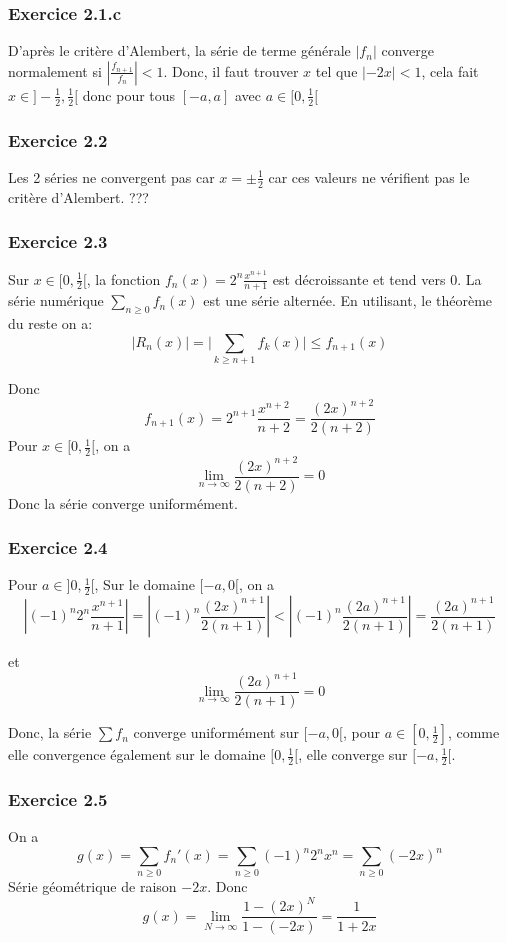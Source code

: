 \documentclass[]{book}
\theoremstyle{definition}
\begin{document}
\subsubsection*{Exercice 2.1.c}
D'apr\`es le crit\`ere d'Alembert, la s\'erie de terme g\'en\'erale $\lvert f_n \rvert$ converge normalement si $\left\lvert \frac{f_{n+1}}{f_n} \right\rvert < 1$. Donc, il faut trouver $x$ tel que  $\lvert -2x \rvert < 1$, cela fait $x \in ]-\frac{1}{2}, \frac{1}{2}[$ donc pour tous $[-a,a]$ avec $a \in [0,\frac{1}{2}[$


\subsubsection*{Exercice 2.2}
Les 2 s\'eries ne convergent pas car $x=\pm \frac{1}{2}$ car ces valeurs ne v\'erifient pas le crit\`ere d'Alembert. ???


\subsubsection*{Exercice 2.3}
Sur $x \in [0,\frac{1}{2}[$, la fonction $f_n(x) = 2^n\frac{x^{n+1}}{n+1}$ est d\'ecroissante et tend vers 0. La s\'erie num\'erique $\sum_{n \ge 0} f_n(x)$ est une s\'erie altern\'ee. En utilisant, le th\'eor\`eme du reste on a:
$$\lvert R_n(x) \rvert = \lvert \sum_{k \ge n+1}f_k(x) \rvert \le f_{n+1}(x)$$

Donc
$$
f_{n+1}(x) = 2^{n+1}\frac{x^{n+2}}{n+2} = \frac{(2x)^{n+2}}{2(n+2)}
$$
Pour $x \in [0,\frac{1}{2}[$, on a
$$\lim_{n \to \infty} \frac{(2x)^{n+2}}{2(n+2)} = 0$$
Donc la s\'erie converge uniform\'ement.

\subsubsection*{Exercice 2.4}
Pour $a \in ]0,\frac{1}{2}[$, Sur le domaine $[-a,0[$, on a
$$
|(-1)^n2^n\frac{x^{n+1}}{n+1}| = |(-1)^n\frac{(2x)^{n+1}}{2(n+1)}| < |(-1)^n\frac{(2a)^{n+1}}{2(n+1)}| = \frac{(2a)^{n+1}}{2(n+1)}
$$

et 
$$
\lim_{n \to \infty} \frac{(2a)^{n+1}}{2(n+1)} = 0
$$

Donc, la s\'erie $\sum f_n$ converge uniform\'ement sur $[-a,0[$, pour $a \in [0,\frac{1}{2}]$, comme elle convergence \'egalement sur le domaine $[0,\frac{1}{2}[$, elle converge sur $[-a, \frac{1}{2}[$.

\subsubsection*{Exercice 2.5}
On a
$$g(x) = \sum_{n \ge 0}f_n'(x) = \sum_{n \ge 0} (-1)^n2^nx^n = \sum_{n \ge 0} (-2x)^n$$
S\'erie g\'eom\'etrique de raison $-2x$. Donc
$$g(x) = \lim_{N \to \infty} \frac{1-(2x)^N}{1-(-2x)} = \frac{1}{1+2x}$$
\end{document}
